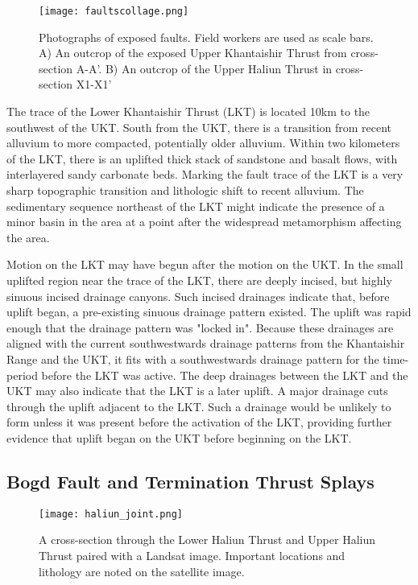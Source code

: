 \begin{figure}[p!]
  \centering
  \texttt{[image: faultscollage.png]}
  \caption{Photographs of exposed faults. Field workers are used as scale bars. A) An outcrop of the exposed Upper Khantaishir Thrust from cross-section A-A'. B) An outcrop of the Upper Haliun Thrust in cross-section X1-X1'}
  \label{faultzones}
\end{figure}

The trace of the Lower Khantaishir Thrust (LKT) is located 10km to the southwest of the UKT. South from the UKT, there is a transition from recent alluvium to more compacted, potentially older alluvium. Within two kilometers of the LKT, there is an uplifted thick stack of sandstone and basalt flows, with interlayered sandy carbonate beds. Marking the fault trace of the LKT is a very sharp topographic transition and lithologic shift to recent alluvium. The sedimentary sequence northeast of the LKT might indicate the presence of a minor basin in the area at a point after the widespread metamorphism affecting the area.

Motion on the LKT may have begun after the motion on the UKT. In the small uplifted region near the trace of the LKT, there are deeply incised, but highly sinuous incised drainage canyons. Such incised drainages indicate that, before uplift began, a pre-existing sinuous drainage pattern existed. The uplift was rapid enough that the drainage pattern was "locked in". Because these drainages are aligned with the current southwestwards drainage patterns from the Khantaishir Range and the UKT, it fits with a southwestwards drainage pattern for the time-period before the LKT was active. The deep drainages between the LKT and the UKT may also indicate that the LKT is a later uplift. A major drainage cuts through the uplift adjacent to the LKT. Such a drainage would be unlikely to form unless it was present before the activation of the LKT, providing further evidence that uplift began on the UKT before beginning on the LKT.

\subsection{Bogd Fault and Termination Thrust Splays}


\begin{figure}[p!]
  \centering
  \texttt{[image: haliun\_joint.png]}
  \caption{A cross-section through the Lower Haliun Thrust and Upper Haliun Thrust paired with a Landsat image. Important locations and lithology are noted on the satellite image.}
  \label{haliun_joint}
\end{figure}

